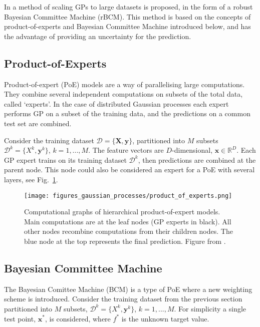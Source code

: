 \documentclass[twoside,english]{uiofysmaster}
\begin{document}
{{In \cite{deisenroth2015distributed} a method of scaling GPs to large datasets is proposed, in the form of a robust Bayesian Committee Machine (rBCM). This method is based on the concepts of product-of-experts and Bayesian Committee Machine introduced below, and has the advantage of providing an uncertainty for the prediction.


\subsection{Product-of-Experts}

Product-of-expert (PoE) models are a way of parallelising large computations. They combine several independent computations on subsets of the total data, called `experts'. In the case of distributed Gaussian processes each expert performs GP on a subset of the training data, and the predictions on a common test set are combined. 

Consider the training dataset $\mathcal{D} = \{ \textbf{X}, \textbf{y}\}$, partitioned into $M$ subsets $\mathcal{D}^k = \{X^k, \textbf{y}^k \}$, $k = 1,...,M$. The feature vectors are $D$-dimensional, $\textbf{x} \in \mathbb{R}^D$. Each GP expert trains on its training dataset $\mathcal{D}^k$, then predictions are combined at the parent node. This node could also be considered an expert for a PoE with several layers, see Fig.~\ref{Fig:: gaussian process : DGP illustration of layers}. 

\begin{figure}
\texttt{[image: figures\_gaussian\_processes/product\_of\_experts.png]}
\caption{Computational graphs of hierarchical product-of-expert models. Main computations are at the leaf nodes (GP experts in black). All other nodes recombine computations from their children nodes. The blue node at the top represents the final prediction. Figure from \cite{deisenroth2015distributed}.}
\label{Fig:: gaussian process : DGP illustration of layers}
\end{figure}

\subsection{Bayesian Committee Machine}

The Bayesian Comittee Machine (BCM) \cite{tresp2000bayesian} is a type of PoE where a new weighting scheme is introduced. Consider the training dataset from the previous section partitioned into $M$ subsets, $\mathcal{D}^k = \{X^k, \textbf{y}^k \}$, $k = 1,...,M$. For simplicity a single test point, $\textbf{x}^*$, is considered, where $f^*$ is the unknown target value. 

}}
\end{document}
